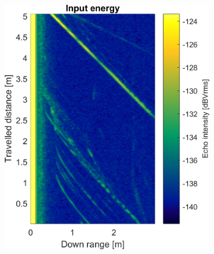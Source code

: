 \begin{figure}[htbp]
    \centering
    \begin{subfigure}[t]{0.475\linewidth}
        \centering
        \includegraphics[width=\linewidth,max height=.475\textheight]{gfx/results/cafeteria_input.png}
    \end{subfigure}%
    \hfill%
    \begin{subfigure}[t]{0.475\linewidth}  
        \centering 

\end{subfigure}
\end{figure}
